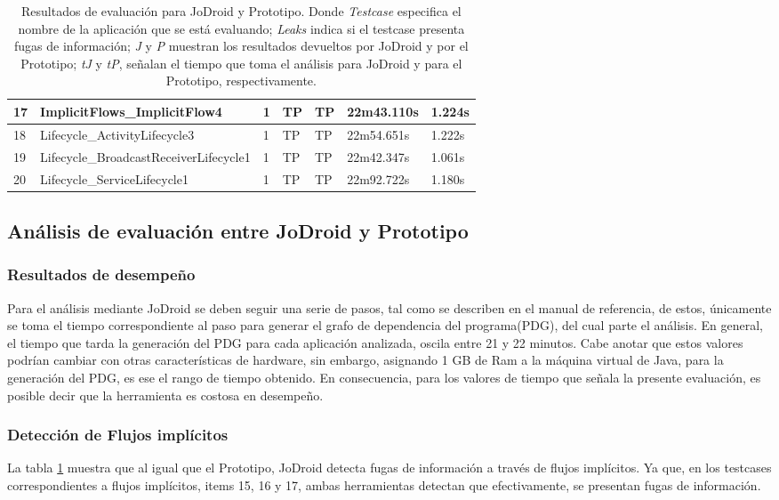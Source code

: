 \begin{table}[t]
\begin{center}
\begin{tabular}{|p{0.8cm}|p{6cm}|p{1cm}|p{0.8cm}|p{0.8cm}|p{}|p{1cm}|}
	\hline
	17 & ImplicitFlows\_ImplicitFlow4 & 1 & TP & TP &22m43.110s&1.224s\\
	\hline
	18 & Lifecycle\_ActivityLifecycle3 & 1 & TP & TP &22m54.651s&1.222s\\
	\hline
	19 & Lifecycle\_BroadcastReceiverLifecycle1 & 1 & TP & TP &22m42.347s&1.061s\\
	\hline
	20 & Lifecycle\_ServiceLifecycle1 & 1 & TP & TP &22m92.722s&1.180s\\
	\hline
\end{tabular}
\end{center}
\caption{Resultados de evaluación para JoDroid y Prototipo. Donde
\textit{Testcase} especifica el nombre de la aplicación que se está evaluando;
\textit{Leaks} indica si el testcase presenta fugas de información; \textit{J} y
\textit{P} muestran los resultados devueltos por JoDroid y por el Prototipo;
\textit{tJ} y \textit{tP}, señalan el tiempo que toma el análisis para JoDroid
y para el Prototipo, respectivamente.}
\label{tab:JoDroid-Prototipo}
\end{table}

\subsection{Análisis de evaluación entre JoDroid y Prototipo}
\subsubsection{Resultados de desempeño}
Para el análisis mediante JoDroid se deben seguir una serie de pasos, tal como
se describen en el manual de referencia\cite{joDroidManual}, de estos,
únicamente se toma el tiempo correspondiente al paso para generar el
grafo de dependencia del programa(PDG), del cual parte el análisis. En general,
el tiempo que tarda la generación del PDG para cada aplicación analizada, oscila
entre 21 y 22 minutos. Cabe anotar que estos valores podrían cambiar con otras
características de hardware, sin embargo, asignando 1 GB de Ram a la máquina
virtual de Java, para la generación del PDG, es ese el rango de tiempo obtenido.
En consecuencia, para los valores de tiempo que señala la presente evaluación,
es posible decir que la herramienta es costosa en desempeño.

\subsubsection{Detección de Flujos implícitos}
La tabla \ref{tab:JoDroid-Prototipo} muestra que al igual que el Prototipo,
JoDroid detecta fugas de información a través de flujos implícitos. Ya que,
en los testcases correspondientes a flujos implícitos, items 15, 16 y 17, ambas
herramientas detectan que efectivamente, se presentan fugas de
información.\newline

